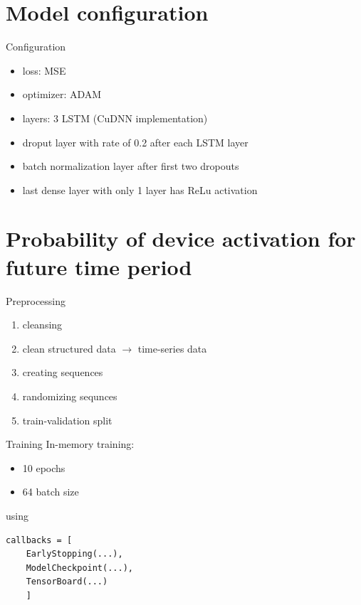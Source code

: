 \documentclass{beamer}
\begin{document}
  \section{Model configuration}
  \begin{frame}{Configuration}
    \begin{itemize}
      \item loss: MSE 
      \item optimizer: ADAM
      \item layers: 3 LSTM (CuDNN implementation)
      \item droput layer with rate of 0.2 after each LSTM layer
      \item batch normalization layer after first two dropouts
      \item last dense layer with only 1 layer has ReLu activation
    \end{itemize}
  \end{frame}

  \section{Probability of device activation for future time period}
  \begin{frame}{Preprocessing}
    \begin{enumerate}
      \item cleansing
      \item clean structured data $\rightarrow$ time-series data
      \item creating sequences
      \item randomizing sequnces  
      \item train-validation split
    \end{enumerate}
  \end{frame}

  \begin{frame}[fragile]{Training}
    In-memory training:
    \begin{itemize}
      \item 10 epochs
      \item 64 batch size
    \end{itemize}
    using 
    \begin{verbatim}
callbacks = [
    EarlyStopping(...),
    ModelCheckpoint(...),
    TensorBoard(...)
    ]  
    \end{verbatim}
  \end{frame}
\end{document}
